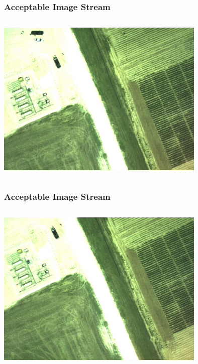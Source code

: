 \documentclass{beamer}
\begin{document}
\begin{frame}
\frametitle{Acceptable Image Stream}
\begin{columns}
\begin{centering}
\includegraphics[width = 10cm]{Figures/good1}
\end{centering}
\end{columns}
\end{frame}


\begin{frame}
\frametitle{Acceptable Image Stream}
\begin{columns}
\begin{centering}
\includegraphics[width = 10cm]{Figures/good2}
\end{centering}
\end{columns}
\end{frame}
\end{document}
